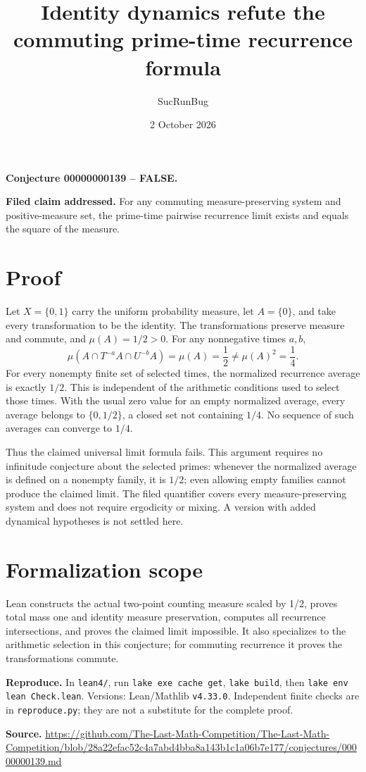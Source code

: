 \documentclass[11pt]{article}
\title{Identity dynamics refute the commuting prime-time recurrence formula}
\author{SucRunBug}
\date{2 October 2026}
\begin{document}
\maketitle
\textbf{Conjecture 00000000139 -- FALSE.}

\textbf{Filed claim addressed.} For any commuting measure-preserving system and positive-measure set, the prime-time pairwise recurrence limit exists and equals the square of the measure.

\section*{Proof}
Let $X=\{0,1\}$ carry the uniform probability measure, let $A=\{0\}$, and take every transformation to be the identity. The transformations preserve measure and commute, and $\mu(A)=1/2>0$. For any nonnegative times $a,b$,
\[\mu(A\cap T^{-a}A\cap U^{-b}A)=\mu(A)=\frac12\ne\mu(A)^2=\frac14.\]
For every nonempty finite set of selected times, the normalized recurrence average is exactly $1/2$. This is independent of the arithmetic conditions used to select those times. With the usual zero value for an empty normalized average, every average belongs to $\{0,1/2\}$, a closed set not containing $1/4$. No sequence of such averages can converge to $1/4$.

Thus the claimed universal limit formula fails. This argument requires no infinitude conjecture about the selected primes: whenever the normalized average is defined on a nonempty family, it is $1/2$; even allowing empty families cannot produce the claimed limit. The filed quantifier covers every measure-preserving system and does not require ergodicity or mixing. A version with added dynamical hypotheses is not settled here.

\section*{Formalization scope}
Lean constructs the actual two-point counting measure scaled by 1/2, proves total mass one and identity measure preservation, computes all recurrence intersections, and proves the claimed limit impossible. It also specializes to the arithmetic selection in this conjecture; for commuting recurrence it proves the transformations commute.

\textbf{Reproduce.} In \texttt{lean4/}, run \texttt{lake exe cache get},
\texttt{lake build}, then \texttt{lake env lean Check.lean}. Versions:
Lean/Mathlib \texttt{v4.33.0}. Independent finite checks are in
\texttt{reproduce.py}; they are not a substitute for the complete proof.

\textbf{Source.} \url{https://github.com/The-Last-Math-Competition/The-Last-Math-Competition/blob/28a22efac52c4a7abd4bba8a143b1c1a06b7e177/conjectures/00000000139.md}
\end{document}
